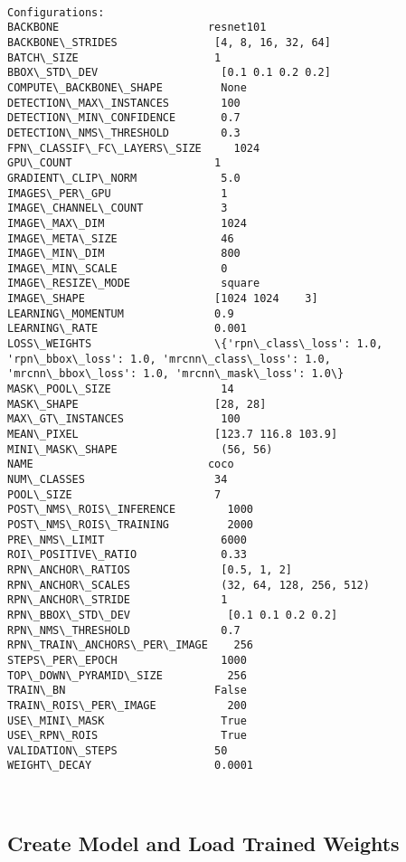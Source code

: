 \documentclass[11pt]{article}
\begin{document}
    \begin{Verbatim}[commandchars=\\\{\}]

Configurations:
BACKBONE                       resnet101
BACKBONE\_STRIDES               [4, 8, 16, 32, 64]
BATCH\_SIZE                     1
BBOX\_STD\_DEV                   [0.1 0.1 0.2 0.2]
COMPUTE\_BACKBONE\_SHAPE         None
DETECTION\_MAX\_INSTANCES        100
DETECTION\_MIN\_CONFIDENCE       0.7
DETECTION\_NMS\_THRESHOLD        0.3
FPN\_CLASSIF\_FC\_LAYERS\_SIZE     1024
GPU\_COUNT                      1
GRADIENT\_CLIP\_NORM             5.0
IMAGES\_PER\_GPU                 1
IMAGE\_CHANNEL\_COUNT            3
IMAGE\_MAX\_DIM                  1024
IMAGE\_META\_SIZE                46
IMAGE\_MIN\_DIM                  800
IMAGE\_MIN\_SCALE                0
IMAGE\_RESIZE\_MODE              square
IMAGE\_SHAPE                    [1024 1024    3]
LEARNING\_MOMENTUM              0.9
LEARNING\_RATE                  0.001
LOSS\_WEIGHTS                   \{'rpn\_class\_loss': 1.0, 'rpn\_bbox\_loss': 1.0, 'mrcnn\_class\_loss': 1.0, 'mrcnn\_bbox\_loss': 1.0, 'mrcnn\_mask\_loss': 1.0\}
MASK\_POOL\_SIZE                 14
MASK\_SHAPE                     [28, 28]
MAX\_GT\_INSTANCES               100
MEAN\_PIXEL                     [123.7 116.8 103.9]
MINI\_MASK\_SHAPE                (56, 56)
NAME                           coco
NUM\_CLASSES                    34
POOL\_SIZE                      7
POST\_NMS\_ROIS\_INFERENCE        1000
POST\_NMS\_ROIS\_TRAINING         2000
PRE\_NMS\_LIMIT                  6000
ROI\_POSITIVE\_RATIO             0.33
RPN\_ANCHOR\_RATIOS              [0.5, 1, 2]
RPN\_ANCHOR\_SCALES              (32, 64, 128, 256, 512)
RPN\_ANCHOR\_STRIDE              1
RPN\_BBOX\_STD\_DEV               [0.1 0.1 0.2 0.2]
RPN\_NMS\_THRESHOLD              0.7
RPN\_TRAIN\_ANCHORS\_PER\_IMAGE    256
STEPS\_PER\_EPOCH                1000
TOP\_DOWN\_PYRAMID\_SIZE          256
TRAIN\_BN                       False
TRAIN\_ROIS\_PER\_IMAGE           200
USE\_MINI\_MASK                  True
USE\_RPN\_ROIS                   True
VALIDATION\_STEPS               50
WEIGHT\_DECAY                   0.0001



    \end{Verbatim}

    \subsection{Create Model and Load Trained
Weights}\label{create-model-and-load-trained-weights}
\end{document}
